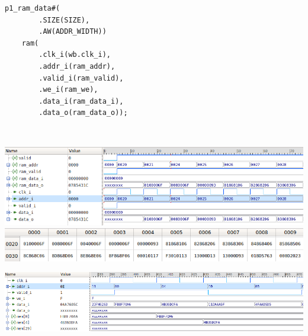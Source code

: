 \documentclass[11pt,a4paper]{article}
\begin{document}
\begin{minipage}{.49\textwidth}
\begin{scriptsize}
\begin{lstlisting}[label=Lis:ram_1p_data,caption=Instancja pamięci danych]
    p1_ram_data#(
        .SIZE(SIZE),
        .AW(ADDR_WIDTH))
    ram(
        .clk_i(wb.clk_i),
        .addr_i(ram_addr),
        .valid_i(ram_valid),
        .we_i(ram_we),
        .data_i(ram_data_i),
        .data_o(ram_data_o));
\end{lstlisting}
\end{scriptsize}
\end{minipage}\\
					\begin{minipage}[c]{\textwidth}


					\includegraphics[width=\textwidth]{./rysunki/ram_sim.png}
					\includegraphics[width=\textwidth]{./rysunki/pamiec_ram.png}
			\end{minipage} 
					\begin{minipage}[c]{\textwidth}

					\includegraphics[width=\textwidth]{./rysunki/zapis_ram.png}
			\end{minipage} 
			
\end{document}
